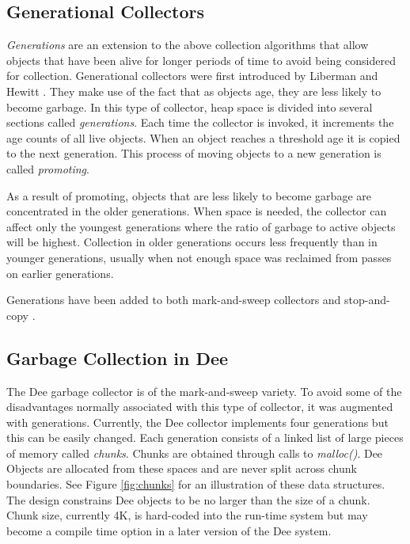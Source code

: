 \subsection{Generational Collectors}

{\em Generations} are an extension to the above collection algorithms
that allow objects that have been alive for longer periods of time to
avoid being considered for collection.  Generational collectors were
first introduced by Liberman and Hewitt \cite{Lieberman83}.  They make
use of the fact that as objects age, they are less likely to become
garbage.  In this type of collector, heap space is divided into
several sections called {\em generations}.  Each time the collector is
invoked, it increments the age counts of all live objects.  When an
object reaches a threshold age it is copied to the next generation.
This process of moving objects to a new generation is called {\em
promoting}.

As a result of promoting, objects that are less likely to become
garbage are concentrated in the older generations.  When space is
needed, the collector can affect only the youngest generations where
the ratio of garbage to active objects will be highest.  Collection in
older generations occurs less frequently than in younger generations,
usually when not enough space was reclaimed from passes on earlier
generations.

Generations have been added to both mark-and-sweep collectors
\cite{Zorn90} and stop-and-copy \cite{Ungar84}.  

\subsection{Garbage Collection in Dee}

The Dee garbage collector is of the mark-and-sweep variety.  To avoid
some of the disadvantages normally associated with this type of
collector, it was augmented with generations.  Currently, the Dee
collector implements four generations but this can be easily changed.
Each generation consists of a linked list of large pieces of memory
called {\em chunks}.  Chunks are obtained through calls to {\em
malloc()}.  Dee Objects are allocated from these spaces and are never
split across chunk boundaries.  See Figure \ref{fig:chunks} for an
illustration of these data structures.  The design constrains Dee
objects to be no larger than the size of a chunk.  Chunk size,
currently 4K, is hard-coded into the run-time system but may become a
compile time option in a later version of the Dee system.

